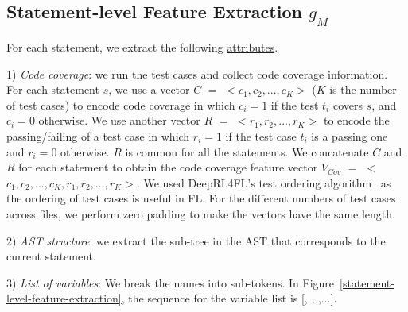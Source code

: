 \subsection{Statement-level Feature Extraction $g_M$}
\label{sec:stmt-level-feature-extraction}

For each statement, we extract the following \underline{attributes}.

1) {\em Code coverage}: we run the test cases and collect
code coverage information. For each statement $s$, we use a vector $C$
$=$ $<$$c_1, c_2, ..., c_K$$>$ ($K$ is the number of test cases) to encode
code coverage in which $c_i=1$ if the test $t_i$ covers $s$, and
$c_i=0$ otherwise. We use another vector $R$ $=$ $<$$r_1, r_2, ..., r_K$$>$ to
encode the passing/failing of a test case in which $r_i=1$ if the test
case $t_i$ is a passing one and $r_i=0$ otherwise. $R$ is common for
all the statements. We concatenate $C$ and $R$ for each statement to
obtain the code coverage feature vector $V_{Cov}$ $=$ $<$$c_1, c_2, ...,
c_K, r_1, r_2, ..., r_K$$>$.
%
We used DeepRL4FL's test ordering algorithm~\cite{icse21-fl} as
the ordering of test cases is useful in FL.
%
For the different numbers of test cases across files, we perform zero
padding to make the vectors have the same length.

2) {\em AST structure}: we extract the sub-tree in the AST that
corresponds to the current statement.

3) {\em List of variables}:
We break the names into sub-tokens. In
Figure~\ref{statement-level-feature-extraction}, the sequence for the
variable list is [, , ,...].





